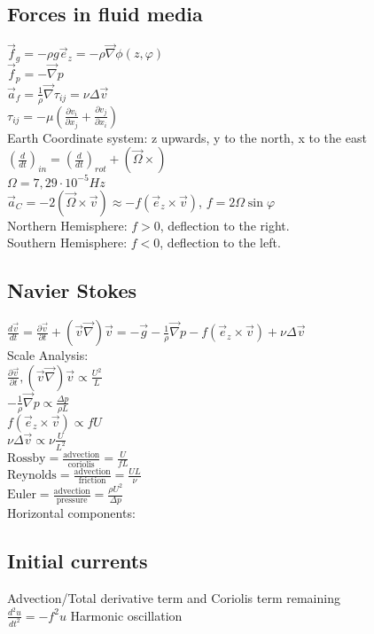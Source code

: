 \subsection*{Forces in fluid media}
$\vec{f}_g=-\rho g \vec{e}_z = -\rho\vec{\nabla}\phi(z,\varphi)$\\
$\vec{f}_p=-\vec{\nabla}p$\\
$\vec{a}_f=\frac{1}{\rho}\vec{\nabla}\tau_{ij}=\nu\Delta \vec{v}$\\
$\tau_{ij}=-\mu\left(\frac{\partial v_i}{\partial x_j}+\frac{\partial v_j}{\partial x_i}\right)$\\
Earth Coordinate system: z upwards, y to the north, x to the east\\
$\left(\frac{d}{dt}\right)_{in}=\left(\frac{d}{dt}\right)_{rot}+(\vec{\Omega}\times)$\\
$\Omega=7,29\cdot10^{-5}Hz$\\
$\vec{a}_C=-2(\vec{\Omega}\times\vec{v})\approx -f(\vec{e}_z\times\vec{v})$, $f=2\Omega\sin{\varphi}$\\
Northern Hemisphere: $f>0$, deflection to the right.\\
Southern Hemisphere: $f<0$, deflection to the left.\\
\subsection*{Navier Stokes}
$\frac{d\vec{v}}{dt}=\frac{\partial\vec{v}}{\partial t}+(\vec{v}\vec{\nabla})\vec{v}=-\vec{g}-\frac{1}{\rho}\vec{\nabla}p-f(\vec{e}_z\times\vec{v})+\nu\Delta\vec{v}$\\
Scale Analysis:\\
$\frac{\partial\vec{v}}{\partial t},(\vec{v}\vec{\nabla})\vec{v}\propto \frac{U^2}{L}$\\
$-\frac{1}{\rho}\vec{\nabla}p\propto \frac{\Delta p}{\rho L}$\\
$f(\vec{e}_z\times\vec{v})\propto fU$\\
$\nu\Delta\vec{v}\propto \nu\frac{U}{L^2}$\\
$\text{Rossby} = \frac{\text{advection}}{\text{coriolis}}=\frac{U}{fL}$\\
$\text{Reynolds}=\frac{\text{advection}}{\text{friction}}=\frac{UL}{\nu}$\\
$\text{Euler}=\frac{\text{advection}}{\text{pressure}}=\frac{\rho U^2}{\Delta p}$\\
Horizontal components:
\subsection*{Initial currents}
Advection/Total derivative term and Coriolis term remaining\\
$\frac{d^2u}{dt^2}=-f^2u$ Harmonic oscillation
